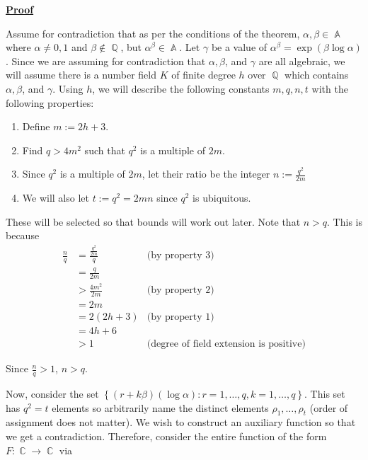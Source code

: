 \documentclass[a4paper, 11pt]{book}
\newcommand{\proof}{\underline{\textbf{Proof}} }
\DeclareMathOperator{\A}{\mathbb{A}}
\DeclareMathOperator{\C}{\mathbb{C}}
\DeclareMathOperator{\Q}{\mathbb{Q}}
\begin{document}
\proof{Assume for contradiction that as per the conditions of the theorem, $\alpha, \beta \in \A$ where $\alpha \neq 0, 1$ and $\beta \notin \Q$, but $\alpha^{\beta} \in \A$. Let $\gamma$ be a value of ${\alpha}^{\beta} = \exp(\beta \log \alpha)$. Since we are assuming for contradiction that $\alpha, \beta$, and $\gamma$ are all algebraic, we will assume there is a number field $K$ of finite degree $h$ over $\Q$ which contains $\alpha, \beta$, and $\gamma$. Using $h$, we will describe the following constants $m,q,n,t$ with the following properties:

    \begin{enumerate}
        \item{Define $m := 2h+3$.}
        \item{Find $q > 4m^2$ such that $q^2$ is a multiple of $2m$.}
        \item{Since $q^2$ is a multiple of $2m$, let their ratio be the integer $n := \frac{q^2}{2m}$}
        \item{We will also let $t := q^2 = 2mn$ since $q^2$ is ubiquitous.}
    \end{enumerate}

    These will be selected so that bounds will work out later. Note that $n > q$. This is because 
    \begin{align*}
        \frac{n}{q} &= \frac{\frac{q^2}{2m}}{q} & \text{(by property 3)}\\
                    &= \frac{q}{2m} \\
                    &> \frac{4m^2}{2m} &\text{(by property 2)}\\
                    &= 2m \\
                    &= 2(2h+3) &\text{(by property 1)}\\
                    &= 4h+6 \\
                    &> 1 &\text{(degree of field extension is positive)} 
    \end{align*}

    Since $\frac{n}{q} > 1$, $n > q$.\par 
    Now, consider the set $\left\{(r + k\beta)(\log \alpha) : r = 1, \ldots, q, k = 1, \ldots, q\right\}$. This set has $q^2 = t$ elements so arbitrarily name the distinct elements $\rho_1, \ldots, \rho_t$ (order of assignment does not matter). We wish to construct an auxiliary function so that we get a contradiction. Therefore, consider the entire function of the form $F: \C \to \C$ via 

}
\end{document}
